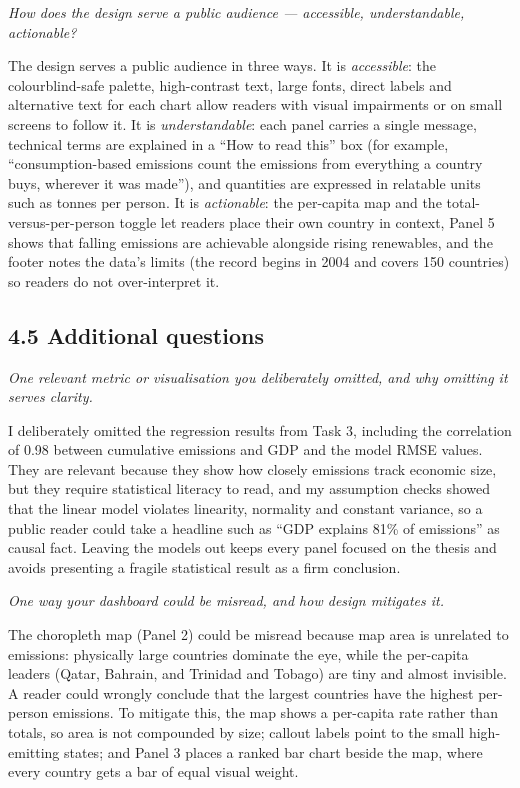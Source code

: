 \documentclass[
]{article}
\begin{document}
\emph{How does the design serve a public audience --- accessible,
understandable, actionable?}

The design serves a public audience in three ways. It is
\emph{accessible}: the colourblind-safe palette, high-contrast text,
large fonts, direct labels and alternative text for each chart allow
readers with visual impairments or on small screens to follow it. It is
\emph{understandable}: each panel carries a single message, technical
terms are explained in a ``How to read this'' box (for example,
``consumption-based emissions count the emissions from everything a
country buys, wherever it was made''), and quantities are expressed in
relatable units such as tonnes per person. It is \emph{actionable}: the
per-capita map and the total-versus-per-person toggle let readers place
their own country in context, Panel 5 shows that falling emissions are
achievable alongside rising renewables, and the footer notes the data's
limits (the record begins in 2004 and covers 150 countries) so readers
do not over-interpret it.

\subsection{4.5 Additional questions}\label{additional-questions}

\emph{One relevant metric or visualisation you deliberately omitted, and
why omitting it serves clarity.}

I deliberately omitted the regression results from Task 3, including the
correlation of 0.98 between cumulative emissions and GDP and the model
RMSE values. They are relevant because they show how closely emissions
track economic size, but they require statistical literacy to read, and
my assumption checks showed that the linear model violates linearity,
normality and constant variance, so a public reader could take a
headline such as ``GDP explains 81\% of emissions'' as causal fact.
Leaving the models out keeps every panel focused on the thesis and
avoids presenting a fragile statistical result as a firm conclusion.

\emph{One way your dashboard could be misread, and how design mitigates
it.}

The choropleth map (Panel 2) could be misread because map area is
unrelated to emissions: physically large countries dominate the eye,
while the per-capita leaders (Qatar, Bahrain, and Trinidad and Tobago)
are tiny and almost invisible. A reader could wrongly conclude that the
largest countries have the highest per-person emissions. To mitigate
this, the map shows a per-capita rate rather than totals, so area is not
compounded by size; callout labels point to the small high-emitting
states; and Panel 3 places a ranked bar chart beside the map, where
every country gets a bar of equal visual weight.
\end{document}
